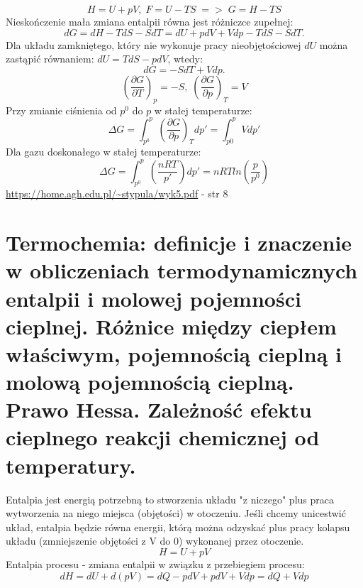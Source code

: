\documentclass{article}
\begin{document}
\begin{equation}
    H = U + pV, \; F = U - TS \; => \; G = H - TS
\end{equation}
Nieskończenie mała zmiana entalpii równa jest różniczce zupełnej:
\begin{equation}
    dG = dH - TdS - SdT = dU + pdV + Vdp - TdS - SdT.
\end{equation}
Dla układu zamkniętego, który nie wykonuje pracy nieobjętościowej $dU$ można zastąpić równaniem: $dU = TdS - pdV$, wtedy:
\begin{equation}
    dG = -SdT + Vdp.
\end{equation}
\begin{equation}
    \left( \frac{\partial G}{\partial T}\right)_p = -S, \; \left( \frac{\partial G}{\partial p}\right)_T = V  
\end{equation}
Przy zmianie ciśnienia od $p^0$ do $p$ w stałej temperaturze:
\begin{equation}
    \Delta G = \int_{p^0}^{p}\left( \frac{\partial G}{\partial p}\right)_T dp' = \int_{p0}^{p}Vdp'
\end{equation}
Dla gazu doskonałego w stałej temperaturze:
\begin{equation}
    \Delta G = \int_{p^0}^{p}\left( \frac{nRT}{p'}\right) dp'= nRTln\left( \frac{p}{p^0}\right)
\end{equation}
\url{https://home.agh.edu.pl/~stypula/wyk5.pdf} - str 8
\section{Termochemia: definicje i znaczenie w obliczeniach termodynamicznych entalpii i molowej pojemności cieplnej. Różnice między ciepłem właściwym, pojemnością cieplną i molową pojemnością cieplną. Prawo Hessa. Zależność efektu cieplnego reakcji chemicznej od temperatury.}

Entalpia jest energią potrzebną to stworzenia układu "z niczego" plus praca wytworzenia na niego miejsca (objętości) w otoczeniu. Jeśli chcemy unicestwić układ, entalpia będzie równa energii, którą można odzyskać plus pracy kolapsu układu (zmniejszenie objętości z V do 0) wykonanej przez otoczenie. 
\begin{equation}
    H = U + pV
\end{equation}
Entalpia procesu - zmiana entalpii w związku z przebiegiem procesu:
\begin{equation}
    dH=dU+d(pV)=dQ-pdV+pdV+Vdp=dQ+Vdp
\end{equation}
\end{document}
